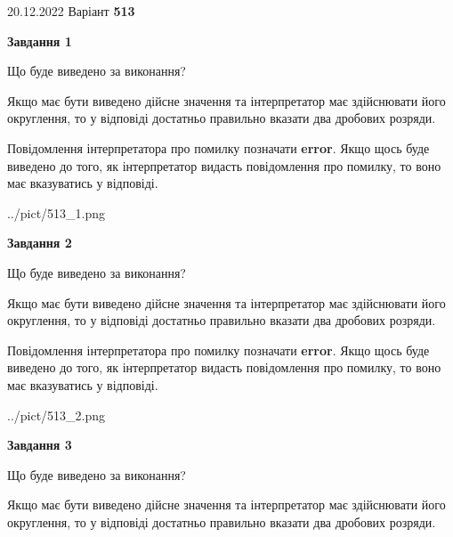 \documentclass[12pt, ukrainian]{article}
\begin{document}
{20.12.2022 Варіант \No \textbf { 513 }\par}
{
\begin {Large}

{\begin {center}\textbf{Завдання 1}\end {center}}\par
Що буде виведено за виконання? \par

Якщо має бути виведено дійсне значення та інтерпретатор має здійснювати його округлення, 
то у відповіді достатньо правильно вказати два дробових розряди.

Повідомлення інтерпретатора про помилку позначати \textbf{error}.
Якщо щось буде виведено до того, як інтерпретатор видасть повідомлення про помилку, 
то воно має вказуватись у відповіді. \par

\begin{center}
	{../pict/513_1.png}
\end{center}
\newpage

{\begin {center}\textbf{Завдання 2}\end {center}}\par
Що буде виведено за виконання? \par

Якщо має бути виведено дійсне значення та інтерпретатор має здійснювати його округлення, 
то у відповіді достатньо правильно вказати два дробових розряди.

Повідомлення інтерпретатора про помилку позначати \textbf{error}.
Якщо щось буде виведено до того, як інтерпретатор видасть повідомлення про помилку, 
то воно має вказуватись у відповіді. \par

\begin{center}
	{../pict/513_2.png}
\end{center}
\newpage

{\begin {center}\textbf{Завдання 3}\end {center}}\par
Що буде виведено за виконання? \par

Якщо має бути виведено дійсне значення та інтерпретатор має здійснювати його округлення, 
то у відповіді достатньо правильно вказати два дробових розряди.


\end{Large}}
\end{document}

